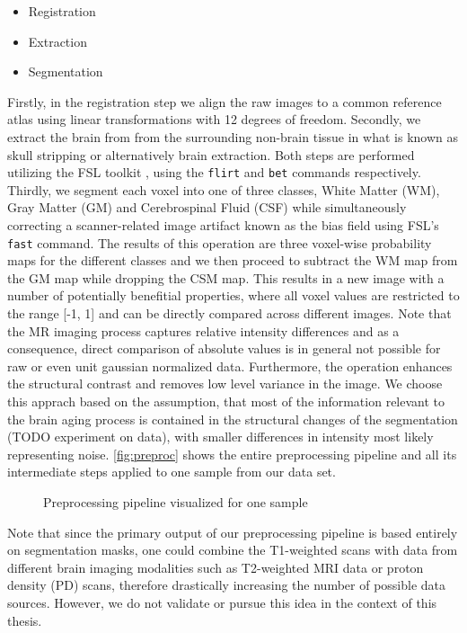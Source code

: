 \begin{itemize}
\item Registration
\item Extraction
\item Segmentation
\end{itemize}

Firstly, in the registration step we align the raw images to a common reference atlas using linear transformations with 12 degrees of freedom. Secondly, we extract the brain from from the surrounding non-brain tissue in what is known as skull stripping or alternatively brain extraction. Both steps are performed utilizing the FSL toolkit \cite{jenkinson2012fsl}, using the \texttt{flirt} \cite{jenkinson2001global} \cite{jenkinson2002improved} and \texttt{bet} \cite{smith2002fast} \cite{jenkinson2005bet2} commands respectively. Thirdly, we segment each voxel into one of three classes, White Matter (WM), Gray Matter (GM) and Cerebrospinal Fluid (CSF) while simultaneously correcting a scanner-related image artifact known as the bias field using FSL's \texttt{fast} \cite{zhang2001segmentation} command. The results of this operation are three voxel-wise probability maps for the different classes and we then proceed to subtract the WM map from the GM map while dropping the CSM map. This results in a new image with a number of potentially benefitial properties, where all voxel values are restricted to the range [-1, 1] and can be directly compared across different images. Note that the MR imaging process captures relative intensity differences and as a consequence, direct comparison of absolute values is in general not possible for raw or even unit gaussian normalized data. Furthermore, the operation enhances the structural contrast and removes low level variance in the image. We choose this apprach based on the assumption, that most of the information relevant to the brain aging process is contained in the structural changes of the segmentation (TODO experiment on data), with smaller differences in intensity most likely representing noise. \autoref{fig:preproc} shows the entire preprocessing pipeline and all its intermediate steps applied to one sample from our data set.

\begin{figure}
	\noindent\makebox[1.1\textwidth]{
		\centering
		
	}
	\caption{Preprocessing pipeline visualized for one sample}
	\label{fig:preproc}
\end{figure}

Note that since the primary output of our preprocessing pipeline is based entirely on segmentation masks, one could combine the T1-weighted scans with data from different brain imaging modalities such as T2-weighted MRI data or proton density (PD) scans, therefore drastically increasing the number of possible data sources. However, we do not validate or pursue this idea in the context of this thesis.

